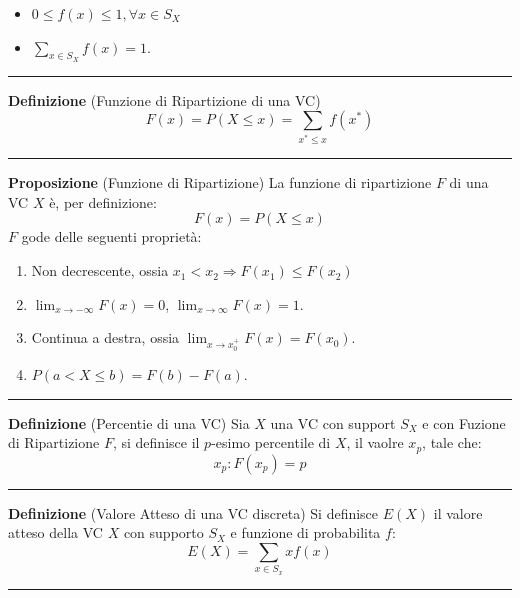 \documentclass[
  11pt,
]{book}
\providecommand{\tightlist}{%
  \setlength{\itemsep}{0pt}\setlength{\parskip}{0pt}}
\theoremstyle{mytheoremstyle}
\theoremstyle{mydefstyle}
\begin{document}
\begin{itemize}
\tightlist
\item
  \(0\le f(x)\le1,\forall x\in S_X\)
\item
  \(\sum_{x\in S_X} f(x) = 1.\)
\end{itemize}

\begin{center}\rule{0.5\linewidth}{0.5pt}\end{center}

\textbf{Definizione} (Funzione di Ripartizione di una VC)
\[
F(x)=P(X\le x)=\sum_{x^*\le x} f(x^*)
\]

\begin{center}\rule{0.5\linewidth}{0.5pt}\end{center}

\textbf{Proposizione} (Funzione di Ripartizione)
La funzione di ripartizione \(F\) di una VC \(X\) è, per definizione:
\[F(x)=P(X\leq x)\]
\(F\) gode delle seguenti proprietà:

\begin{enumerate}
\def\labelenumi{\arabic{enumi}.}
\tightlist
\item
  Non decrescente, ossia \(x_{1}<x_{2} \Rightarrow F(x_{1}) \le F(x_{2})\)
\item
  \(\lim_{x\to -\infty} F(x) = 0\), \qquad \(\lim_{x\to\infty} F(x) = 1\).
\item
  Continua a destra, ossia \(\lim_{x\to x_{0}^{+}} F(x) = F(x_{0})\).
\item
  \(P(a < X \le b) = F(b) - F(a)\).
\end{enumerate}

\begin{center}\rule{0.5\linewidth}{0.5pt}\end{center}

\textbf{Definizione} (Percentie di una VC)
Sia \(X\) una VC con support \(S_X\) e con Fuzione di Ripartizione \(F\), si definisce il \(p\)-esimo percentile di \(X\), il vaolre \(x_p\), tale che:
\[
x_p:F(x_p)=p
\]

\begin{center}\rule{0.5\linewidth}{0.5pt}\end{center}

\textbf{Definizione} (Valore Atteso di una VC discreta)
Si definisce \(E(X)\) il valore atteso della VC \(X\) con supporto \(S_X\) e funzione di probabilita \(f\):
\[
E(X)=\sum_{x\in S_x}xf(x)
\]

\begin{center}\rule{0.5\linewidth}{0.5pt}\end{center}
\end{document}
